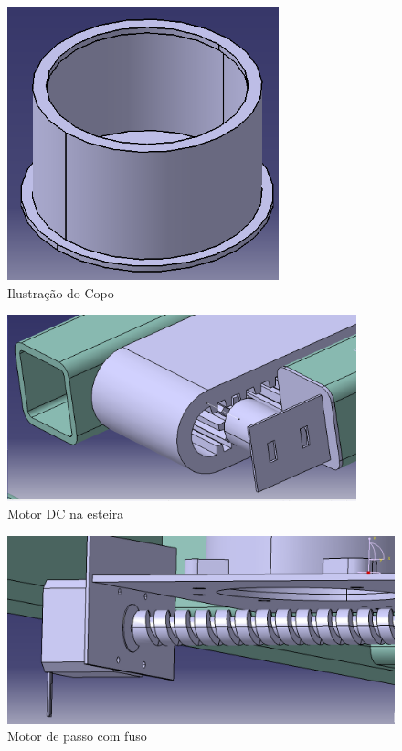\begin{apendicesenv}
\begin{figure}[H]
    \centering
    \includegraphics[width=0.7\textwidth]{figuras/estrutura/Copo.png}
    \caption{Ilustração do Copo}
    \label{fig:copos}
\end{figure}

\begin{figure}[H]
    \centering
    \includegraphics[width=0.9\textwidth]{figuras/estrutura/Motor DC na Esteira.png}
    \caption{Motor DC na esteira}
    \label{fig:DCnaesteira}
\end{figure}

\begin{figure}[H]
    \centering
    \includegraphics[width=1\textwidth]{figuras/estrutura/Motor de Passo no Fuso.png}
    \caption{Motor de passo com fuso}
    \label{fig:motordepassonofuso}
\end{figure}


\end{apendicesenv}

